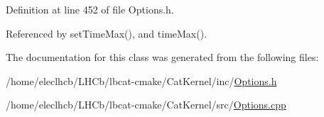 Definition at line 452 of file Options.\+h.



Referenced by set\+Time\+Max(), and time\+Max().



The documentation for this class was generated from the following files\+:\begin{DoxyCompactItemize}
\item 
/home/eleclhcb/\+L\+H\+Cb/lbcat-\/cmake/\+Cat\+Kernel/inc/\hyperlink{Options_8h}{Options.\+h}\item 
/home/eleclhcb/\+L\+H\+Cb/lbcat-\/cmake/\+Cat\+Kernel/src/\hyperlink{Options_8cpp}{Options.\+cpp}\end{DoxyCompactItemize}
